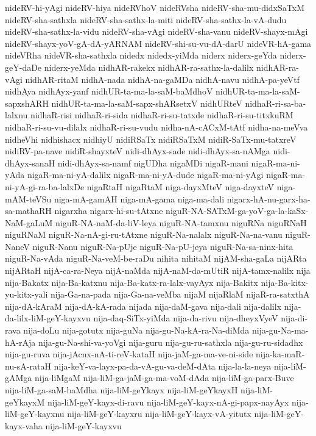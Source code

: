{nideRV-hi-yAgi
nideRV-hiya
nideRVhoV
nideRVsha
nideRV-sha-mu-didxSaTxM
nideRV-sha-sathxla
nideRV-sha-sathx-la-miti
nideRV-sha-sathx-la-vA-dudu
nideRV-sha-sathx-la-vidu
nideRV-sha-vAgi
nideRV-sha-vanu
nideRV-shayx-mAgi
nideRV-shayx-yoV-gA-dA-yARNAM
nideRV-shi-su-vu-dA-darU
nideVR-hA-gama
nideVRha
nideVR-sha-sathxla
nidedx
nidedx-yiMda
niderx
niderx-geYda
niderx-geY-daDe
niderx-yeMda
nidhAR-rakekx
nidhAR-ra-sathx-la-dalilx
nidhAR-ra-vAgi
nidhAR-ritaM
nidhA-nada
nidhA-na-gaMDa
nidhA-navu
nidhA-pa-yeVtf
nidhAya
nidhAyx-yanf
nidhUR-ta-ma-la-saM-baMdhoV
nidhUR-ta-ma-la-saM-sapxshARH
nidhUR-ta-ma-la-saM-sapx-shARsetxV
nidhURteV
nidhaR-ri-sa-ba-lalxnu
nidhaR-risi
nidhaR-ri-sida
nidhaR-ri-su-tatxde
nidhaR-ri-su-titxkuRM
nidhaR-ri-su-vu-dilalx
nidhaR-ri-su-vudu
nidha-nA-cACxM-tAtf
nidha-na-meVva
nidheVhi
nidhishacx
nidhiyU
nidiRSaTx
nidiRSaTxM
nidiR-SaTx-mu-tatxreV
nidiRV-pa-nave
nidiR-shayxteV
nidi-dhAyx-sade
nidi-dhAyx-sa-nAMga
nidi-dhAyx-sanaH
nidi-dhAyx-sa-namf
nigUDha
nigaMDi
nigaR-mani
nigaR-ma-ni-yAda
nigaR-ma-ni-yA-dalilx
nigaR-ma-ni-yA-dude
nigaR-ma-ni-yAgi
nigaR-ma-ni-yA-gi-ra-ba-lalxDe
nigaRtaH
nigaRtaM
niga-dayxMteV
niga-dayxteV
niga-mAM-teVSu
niga-mA-gamAH
niga-mA-gama
niga-ma-dali
nigarx-hA-nu-garx-ha-sa-mathaRH
nigarxha
nigarx-hi-su-tAtxne
niguR-NA-SATxM-ga-yoV-ga-la-kaSx-NaM-gaLuM
niguR-NA-naM-da-liV-leya
niguR-NA-tamxnu
niguRNa
niguRNaH
niguRNaM
niguR-Na-nA-gi-ru-tAtxne
niguR-Na-nalalx
niguR-Na-na-vanu
niguR-NaneV
niguR-Nanu
niguR-Na-pUje
niguR-Na-pU-jeya
niguR-Na-sa-ninx-hita
niguR-Na-vAda
niguR-Na-veM-be-raDu
nihita
nihitaM
nijAM-sha-gaLa
nijARta
nijARtaH
nijA-ca-ra-Neya
nijA-naMda
nijA-naM-da-mUtiR
nijA-tamx-nalilx
nija
nija-Bakatx
nija-Ba-katxnu
nija-Ba-katx-ra-lalx-vayAyx
nija-Bakitx
nija-Ba-kitx-yu-kitx-yali
nija-Ga-na-pada
nija-Ga-na-veMba
nijaM
nijaRlaM
nijaR-ra-satxthA
nija-dA-kAraM
nija-dA-kA-rada
nijada
nija-daM-gava
nija-dali
nija-dalilx
nija-da-lilx-liM-geY-kayxvu
nija-daq-SiTx-yiMda
nija-da-rivu
nija-dheyxVyeV
nija-di-rava
nija-doLu
nija-gotutx
nija-guNa
nija-gu-Na-kA-ra-Na-diMda
nija-gu-Na-ma-hA-rAja
nija-gu-Na-shi-va-yoVgi
nija-guru
nija-gu-ru-sathxla
nija-gu-ru-sidadhx
nija-gu-ruva
nija-jAcnx-nA-ti-reV-kataH
nija-jaM-ga-ma-ve-ni-side
nija-ka-maR-nu-sA-rataH
nija-keY-va-layx-pa-da-vA-gu-va-deM-dAta
nija-la-la-neya
nija-liM-gAMga
nija-liMgaM
nija-liM-ga-jaM-ga-ma-voM-dAda
nija-liM-ga-parx-Buve
nija-liM-ga-saM-baMdha
nija-liM-geYkayx
nija-liM-geYkayxH
nija-liM-geYkayxM
nija-liM-geY-kayx-di-ravu
nija-liM-geY-kayx-nA-gi-papx-nayAyx
nija-liM-geY-kayxnu
nija-liM-geY-kayxru
nija-liM-geY-kayx-vA-yitutx
nija-liM-geY-kayx-vaha
nija-liM-geY-kayxvu
}
